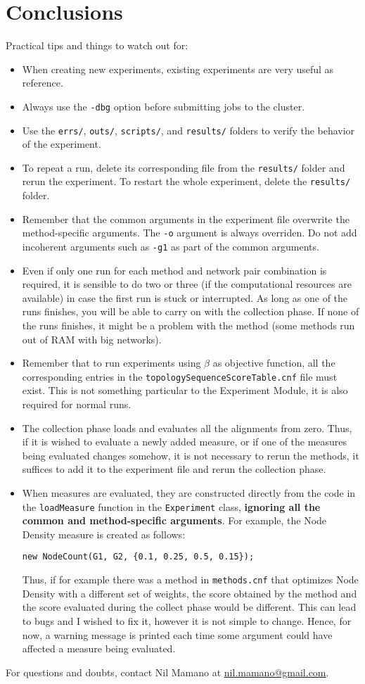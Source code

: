\documentclass[]{article}
\begin{document}
\section{Conclusions}
Practical tips and things to watch out for:
\begin{itemize}
\item When creating new experiments, existing experiments are very useful as reference.
\item Always use the \verb|-dbg| option before submitting jobs to the cluster.
\item Use the \verb|errs/|, \verb|outs/|, \verb|scripts/|, and \verb|results/| folders to verify the behavior of the experiment.
\item To repeat a run, delete its corresponding file from the \verb|results/| folder and rerun the experiment. To restart the whole experiment, delete the \verb|results/| folder.
\item Remember that the common arguments in the experiment file overwrite the method-specific arguments. The \verb|-o| argument is always overriden. Do not add incoherent arguments such as \verb|-g1| as part of the common arguments.
\item Even if only one run for each method and network pair combination is required, it is sensible to do two or three (if the computational resources are available) in case the first run is stuck or interrupted. As long as one of the runs finishes, you will be able to carry on with the collection phase. If none of the runs finishes, it might be a problem with the method (some methods run out of RAM with big networks).
\item Remember that to run experiments using $\beta$ as objective function, all the corresponding entries in the \verb|topologySequenceScoreTable.cnf| file must exist. This is not something particular to the Experiment Module, it is also required for normal runs.
\item The collection phase loads and evaluates all the alignments from zero. Thus, if it is wished to evaluate a newly added measure, or if one of the measures being evaluated changes somehow, it is not necessary to rerun the methods, it suffices to add it to the experiment file and rerun the collection phase.
\item When measures are evaluated, they are constructed directly from the code in the \verb|loadMeasure| function in the \verb|Experiment| class, \textbf{ignoring all the common and method-specific arguments}. For example, the Node Density measure is created as follows:
\begin{verbatim}
new NodeCount(G1, G2, {0.1, 0.25, 0.5, 0.15});
\end{verbatim}
Thus, if for example there was a method in \verb|methods.cnf| that optimizes Node Density with a different set of weights, the score obtained by the method and the score evaluated during the collect phase would be different. This can lead to bugs and I wished to fix it, however it is not simple to change. Hence, for now, a warning message is printed each time some argument could have affected a measure being evaluated.
\end{itemize}
For questions and doubts, contact Nil Mamano at \url{nil.mamano@gmail.com}.
\end{document}
